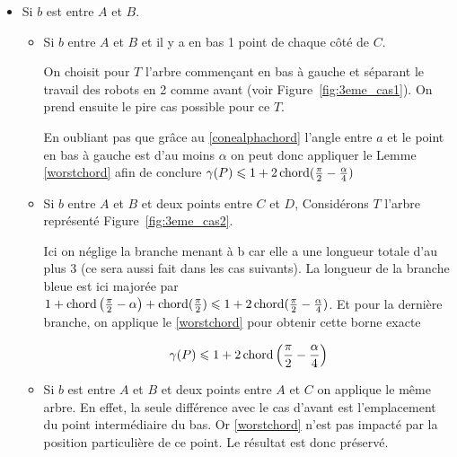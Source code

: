 \begin{itemize}

\item \label{3cas1} Si $b$ est entre $A$ et $B$.

\begin{itemize}

\item \label{3cas11} Si $b$ entre $A$ et $B$ et il y a en bas 1 point de chaque
  côté de $C$.

On choisit pour $T$ l'arbre commençant en bas à gauche et séparant le travail
des robots en 2 comme avant (voir Figure~\ref{fig:3eme_cas1}).
On prend ensuite le pire cas possible pour ce $T$.


En oubliant pas que grâce au \cref{conealphachord} l'angle entre $a$ et le point en bas à gauche est d'au moins $\alpha$ on peut donc appliquer le Lemme \ref{worstchord} afin de conclure
$\gamma(P) \leqslant 1 + 2\operatorname{chord}(\frac{\pi}{2} - \frac{\alpha}{4})$

\item \label{3cas12} Si $b$ entre $A$ et $B$ et deux points entre $C$ et $D$,
	Considérons $T$ l'arbre représenté Figure~\ref{fig:3eme_cas2}.


Ici on néglige la branche menant à b car elle a une longueur totale d'au plus 3 (ce sera
aussi fait dans les cas suivants).
La longueur de la branche bleue est ici majorée par $1+\operatorname{chord}\left(\frac{\pi}{2} - \alpha\right)+\operatorname{chord}(\frac{\pi}{2}) \leqslant 1 + 2\operatorname{chord}(\frac{\pi}{2} - \frac{\alpha}{4})$.
Et pour la dernière branche, on applique le \cref{worstchord} pour obtenir
cette borne exacte

$$\gamma(P) \leqslant 1 + 2\operatorname{chord}\left(\frac{\pi}{2} -
  \frac{\alpha}{4}\right)$$

\item \label{3cas13} Si $b$ est entre $A$ et $B$ et deux points entre $A$
  et $C$ on applique le même arbre. En effet, la seule différence avec le cas d'avant est l'emplacement du point intermédiaire du bas. Or \cref{worstchord} n'est pas impacté par la position particulière de ce point. Le résultat est donc préservé.
  

\end{itemize}
\end{itemize}
